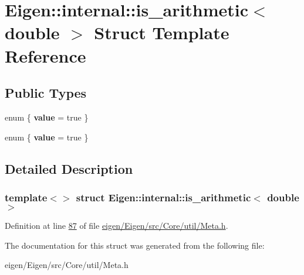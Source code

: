 \hypertarget{struct_eigen_1_1internal_1_1is__arithmetic_3_01double_01_4}{}\section{Eigen\+:\+:internal\+:\+:is\+\_\+arithmetic$<$ double $>$ Struct Template Reference}
\label{struct_eigen_1_1internal_1_1is__arithmetic_3_01double_01_4}
\subsection*{Public Types}
\begin{DoxyCompactItemize}
\item 
\mbox{\label{struct_eigen_1_1internal_1_1is__arithmetic_3_01double_01_4_abbf8787864f1e984a687361a6083736c}} 
enum \{ {\bfseries value} = true
 \}
\item 
\mbox{\label{struct_eigen_1_1internal_1_1is__arithmetic_3_01double_01_4_a90bcfe98d789ec7a5332a9187db7d4d3}} 
enum \{ {\bfseries value} = true
 \}
\end{DoxyCompactItemize}


\subsection{Detailed Description}
\subsubsection*{template$<$$>$\newline
struct Eigen\+::internal\+::is\+\_\+arithmetic$<$ double $>$}



Definition at line \hyperlink{eigen_2_eigen_2src_2_core_2util_2_meta_8h_source_l00087}{87} of file \hyperlink{eigen_2_eigen_2src_2_core_2util_2_meta_8h_source}{eigen/\+Eigen/src/\+Core/util/\+Meta.\+h}.



The documentation for this struct was generated from the following file\+:\begin{DoxyCompactItemize}
\item 
eigen/\+Eigen/src/\+Core/util/\+Meta.\+h\end{DoxyCompactItemize}
